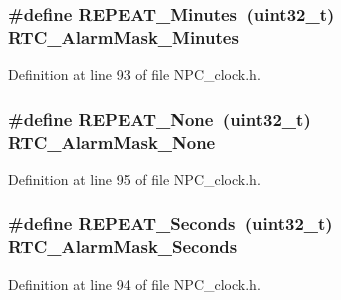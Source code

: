 \subsubsection[{\texorpdfstring{R\+E\+P\+E\+A\+T\+\_\+\+Minutes}{REPEAT_Minutes}}]{\setlength{\rightskip}{0pt plus 5cm}\#define R\+E\+P\+E\+A\+T\+\_\+\+Minutes~(uint32\+\_\+t) R\+T\+C\+\_\+\+Alarm\+Mask\+\_\+\+Minutes}\hypertarget{group___r_e_p_e_a_t___definitions_gac80fc7d65b83128ca58e210922020d37}{}\label{group___r_e_p_e_a_t___definitions_gac80fc7d65b83128ca58e210922020d37}


Definition at line 93 of file N\+P\+C\+\_\+clock.\+h.

\subsubsection[{\texorpdfstring{R\+E\+P\+E\+A\+T\+\_\+\+None}{REPEAT_None}}]{\setlength{\rightskip}{0pt plus 5cm}\#define R\+E\+P\+E\+A\+T\+\_\+\+None~(uint32\+\_\+t) R\+T\+C\+\_\+\+Alarm\+Mask\+\_\+\+None}\hypertarget{group___r_e_p_e_a_t___definitions_ga473d162f72a4680e7e14043dfaf092c0}{}\label{group___r_e_p_e_a_t___definitions_ga473d162f72a4680e7e14043dfaf092c0}


Definition at line 95 of file N\+P\+C\+\_\+clock.\+h.

\subsubsection[{\texorpdfstring{R\+E\+P\+E\+A\+T\+\_\+\+Seconds}{REPEAT_Seconds}}]{\setlength{\rightskip}{0pt plus 5cm}\#define R\+E\+P\+E\+A\+T\+\_\+\+Seconds~(uint32\+\_\+t) R\+T\+C\+\_\+\+Alarm\+Mask\+\_\+\+Seconds}\hypertarget{group___r_e_p_e_a_t___definitions_ga12d07c13f393b5b12efad9cd892de472}{}\label{group___r_e_p_e_a_t___definitions_ga12d07c13f393b5b12efad9cd892de472}


Definition at line 94 of file N\+P\+C\+\_\+clock.\+h.

